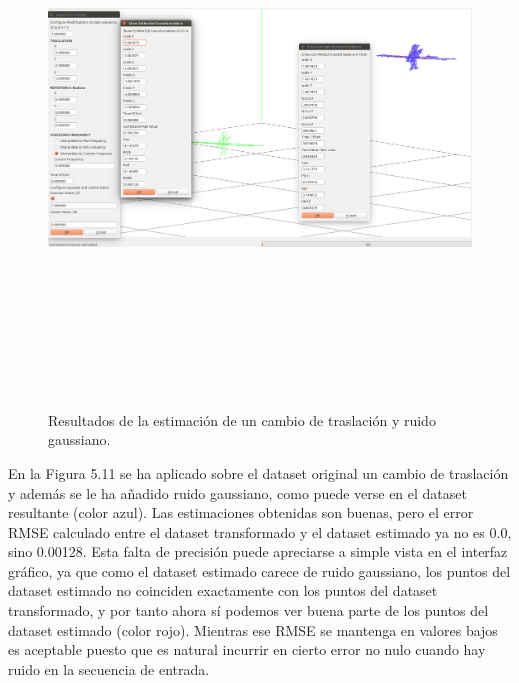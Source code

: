 \begin{figure}[H]
\begin{center}
\label{fig:opciones de View}\includegraphics[height=14.0cm,width=18.0cm]{img/cap6/Trasla_GaussNoise_abba.png}
\hspace{0.5cm}

\end{center}

\caption{Resultados de la estimación de un cambio de traslación y ruido gaussiano.}
\end{figure}
En la Figura 5.11 se ha aplicado sobre el dataset original un cambio de traslación y además se le ha añadido ruido gaussiano, como puede verse en el dataset resultante (color azul). Las estimaciones obtenidas son buenas, pero el error RMSE calculado entre el dataset transformado y el dataset estimado ya no es 0.0, sino 0.00128. Esta falta de precisión puede apreciarse a simple vista en el interfaz gráfico, ya que como el dataset estimado carece de ruido gaussiano, los puntos del dataset estimado no coinciden exactamente con los puntos del dataset transformado, y por tanto ahora sí podemos ver buena parte de los puntos del dataset estimado (color rojo).
Mientras ese RMSE se mantenga en valores bajos es aceptable puesto que es natural incurrir en cierto error no nulo cuando hay ruido en la secuencia de entrada.

